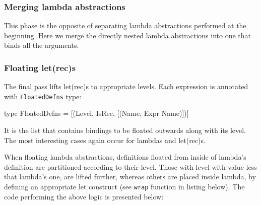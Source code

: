 \documentclass[12pt,a4paper]{report}
\begin{document}
\subsubsection{Merging lambda abstractions}
This phase is the opposite of separating lambda abstractions performed at the
beginning. Here we merge the directly nested lambda abstractions into one that
binds all the arguments.

\subsubsection{Floating let(rec)s}
The final pass lifts let(rec)s to appropriate levels. Each expression is
annotated with \texttt{FloatedDefns} type:

\vspace*{0.2in}
\begin{code}[style=haskell]
type FloatedDefns = [(Level, IsRec, [(Name, Expr Name)])]
\end{code}

It is the list that contains bindings to be floated outwards along with its
level. The most interesting cases again occur for lambdas and let(rec)s.

When floating lambda abstractions, definitions floated from inside of lambda's
definition are partitioned according to their level. Those with level with
value less that lambda's one, are lifted further, whereas others are placed
inside lambda, by defining an appropriate let construct (see \texttt{wrap}
function in listing below). The code performing the above logic is presented
below:

\vspace*{0.2in}
\end{document}
